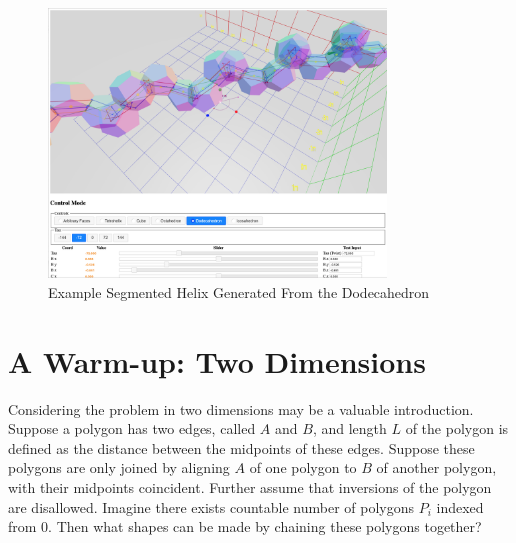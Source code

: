\documentclass[11pt]{article}
\begin{document}
{\begin{figure}
     \centering
     \includegraphics[width=0.80\textwidth]{figures/Dodecahedral.png}
     \caption{Example Segmented Helix Generated From the Dodecahedron}
  \label{fig:dodecahedron}
\end{figure}


\section{A Warm-up: Two Dimensions}

Considering the problem in two dimensions may be a valuable introduction.
Suppose a polygon has two edges, called $A$ and $B$, and length $L$ of the
polygon is defined as the distance between the midpoints of these edges.
Suppose these
polygons are only joined by aligning $A$ of one polygon to $B$ of another polygon, with their midpoints coincident. Further assume that inversions of the polygon are disallowed.  Imagine there exists
countable number of polygons $P_i$ indexed from $0$. Then what shapes can be made by chaining these
polygons together?

}
\end{document}
